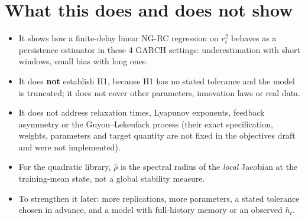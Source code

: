 \documentclass[11pt]{article}
\newcommand{\rhohat}{\hat\rho}
\begin{document}
\section{What this does and does not show}
\begin{itemize}
\item It shows how a finite-delay linear NG-RC regression on $r_t^2$ behaves as a persistence estimator in these 4 GARCH settings: underestimation with short windows, small bias with long ones.
\item It does \textbf{not} establish H1, because H1 has no stated tolerance and the model is truncated; it does not cover other parameters, innovation laws or real data.
\item It does not address relaxation times, Lyapunov exponents, feedback asymmetry or the Guyon--Lekeufack process (their exact specification, weights, parameters and target quantity are not fixed in the objectives draft and were not implemented).
\item For the quadratic library, $\rhohat$ is the spectral radius of the \emph{local} Jacobian at the training-mean state, not a global stability measure.
\item To strengthen it later: more replications, more parameters, a stated tolerance chosen in advance, and a model with full-history memory or an observed $h_t$.
\end{itemize}
\end{document}

